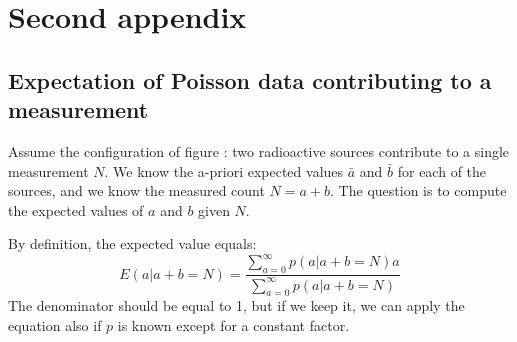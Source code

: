\chapter{Second appendix}

\section{Expectation of Poisson data contributing to a measurement
\label{app:expected_a_b}}
Assume the configuration of figure : two radioactive
sources contribute to a single measurement $N$. We know the a-priori expected
values $\bar{a}$ and $\bar{b}$ for each of the sources, and we know the
measured count $N = a + b$. The question is to compute the expected values of
$a$ and $b$ given $N$.

 By definition, the expected value equals:
\begin{equation}
  E(a | a + b = N) = \frac{\sum_{a=0}^\infty p(a | a + b = N) a}
                          {\sum_{a=0}^\infty p(a | a + b = N)}
  \label{eq:appab1}
\end{equation}
The denominator should be equal to 1, but if we keep it, we can apply the
equation also if $p$ is known except for a constant factor.

